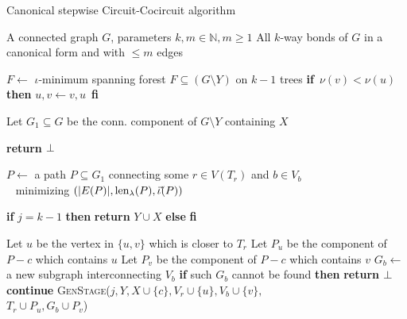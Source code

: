 \begin{algorithm}
	\caption{Canonical stepwise Circuit-Cocircuit algorithm}
	\label{alg:final}
\begin{algorithmic}[1]
	\Require A connected graph $G$, parameters $k,m \in \mathbb{N}, m \geq 1$
	\Ensure All $k$-way bonds of $G$ in a canonical form and with $\leq m$ edges

	\State {}
	\State $F \leftarrow$ $\iota$-minimum spanning forest $F \subseteq (G \setminus Y )$ on $k-1$ trees
		\State \textbf{if} $ \, \nu(v) < \nu(u)$ \textbf{then}  $u,v \leftarrow v, u \,$ \textbf{fi}
		\State {}
	\EndFor
	\EndProcedure


	\State Let $G_1 \subseteq G$ be the conn. component of $G \setminus Y$ containing $X$

		\State \textbf{return $\perp$}
	\EndIf

	\State $P \leftarrow$ a path $P \subseteq G_1$ connecting some $r \in V(T_r)$ and $b \in V_b$ \\
	\qquad \quad \,\,\, minimizing $(\lvert E(P) \rvert, \operatorname{len}_\lambda(P), \vec{\iota}(P) )$

		\State \textbf{if} $j = k - 1$ \textbf{then} \textbf{return} $Y \cup X$ 
		\State \textbf{else}  \textbf{fi}

	\Else
			\State Let $u$ be the vertex in $\{u,v\}$ which is closer to $T_r$
			\State Let $P_u$ be the component of $P - c$ which contains $u$
			\State Let $P_v$ be the component of $P - c$ which contains $v$
				\State $G_b \leftarrow$ a new subgraph interconnecting $V_b$
				\State \textbf{if} such $G_b$ cannot be found \textbf{then} \textbf{return $\perp$}
			\EndIf
				\State \textbf{continue}
			\EndIf
			\State \textsc{GenStage}($j, Y, X \cup \{c\}, V_r \cup \{u\}, V_b \cup \{v\},$ \\
			\hskip 116.8pt $T_r \cup P_u, G_b \cup P_v$)
		\EndFor
	\EndIf

	\EndProcedure
\end{algorithmic}
\end{algorithm}

